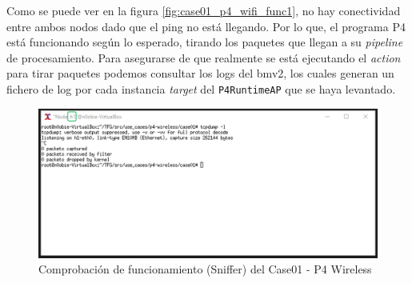 Como se puede ver en la figura \ref{fig:case01_p4_wifi_func1}, no hay conectividad entre ambos nodos dado que el ping \hspace{1mm} no está llegando. Por lo que, el programa P4 está funcionando según lo esperado, tirando los paquetes que llegan a su \textit{pipeline} de procesamiento. Para asegurarse de que realmente se está ejecutando el \textit{action} para tirar paquetes podemos consultar los logs del \gls{bmv2}, los cuales generan un fichero de log por cada instancia \textit{target} del \texttt{P4RuntimeAP} que se haya levantado.\\
\par

\newpage

\begin{figure}[ht]
    \centering
    \includegraphics[width=14cm]{archivos/img/dev/p4-wifi/case01/demo_case01_2_edited.png}
    \caption{Comprobación de funcionamiento (Sniffer) del Case01 - P4 Wireless}
    \label{fig:case01_p4_wifi_func2}
\end{figure}